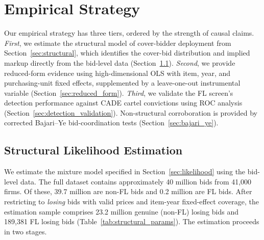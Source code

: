 
\section{Empirical Strategy}
\label{sec:empirical}

Our empirical strategy has three tiers, ordered by the strength of causal
claims. \emph{First}, we estimate the structural model of cover-bidder
deployment from Section~\ref{sec:structural}, which identifies the
cover-bid distribution and implied markup directly from the bid-level
data (Section~\ref{sec:structural_estimation}). \emph{Second}, we
provide reduced-form evidence using high-dimensional OLS with item, year,
and purchasing-unit fixed effects, supplemented by a leave-one-out
instrumental variable (Section~\ref{sec:reduced_form}). \emph{Third}, we
validate the FL screen's detection performance against CADE cartel
convictions using ROC analysis (Section~\ref{sec:detection_validation}).
Non-structural corroboration is provided by corrected Bajari--Ye
bid-coordination tests (Section~\ref{sec:bajari_ye}).


\subsection{Structural Likelihood Estimation}
\label{sec:structural_estimation}

We estimate the mixture model specified in %
Section~\ref{sec:likelihood} using the bid-level data. The full
dataset contains approximately 40 million bids from 41,000 firms.
Of these, 39.7 million are non-FL bids and 0.2 million are FL bids.
After restricting to \emph{losing} bids with valid prices and
item-year fixed-effect coverage, the estimation sample comprises
23.2 million genuine (non-FL) losing bids and 189,381 FL losing bids
(Table~\ref{tab:structural_params}). The estimation proceeds in two
stages.

